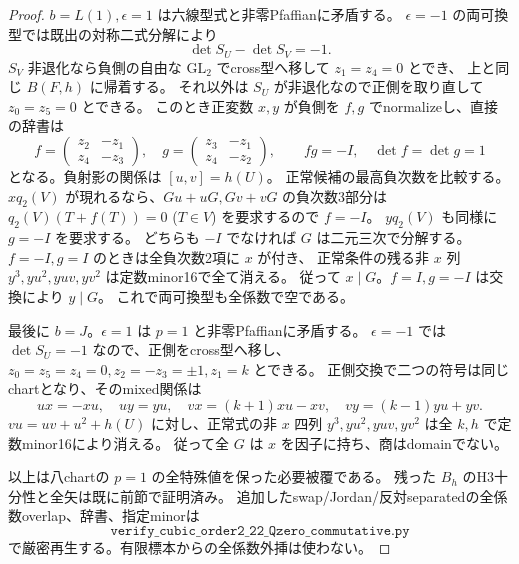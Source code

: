 \begin{proof}
$b=L(1),\epsilon=1$ は六線型式と非零Pfaffianに矛盾する。
$\epsilon=-1$ の両可換型では既出の対称二式分解により
\[
 \det S_U-\det S_V=-1.
\]
$S_V$ 非退化なら負側の自由な $\mathrm{GL}_2$ でcross型へ移して $z_1=z_4=0$ とでき、
上と同じ $B(F,h)$ に帰着する。
それ以外は $S_U$ が非退化なので正側を取り直して $z_0=z_5=0$ とできる。
このとき正変数 $x,y$ が負側を $f,g$ でnormalizeし、直接の辞書は
\[
 f=\begin{pmatrix}z_2&-z_1\\z_4&-z_3\end{pmatrix},\quad
 g=\begin{pmatrix}z_3&-z_1\\z_4&-z_2\end{pmatrix},\qquad
 fg=-I,\quad\det f=\det g=1
\]
となる。負射影の関係は $[u,v]=h(U)$。
正常候補の最高負次数を比較する。
$xq_2(V)$ が現れるなら、$Gu+uG,Gv+vG$ の負次数3部分は
$q_2(V)(T+f(T))=0$ ($T\in V$) を要求するので $f=-I$。
$yq_2(V)$ も同様に $g=-I$ を要求する。
どちらも $-I$ でなければ $G$ は二元三次で分解する。
$f=-I,g=I$ のときは全負次数2項に $x$ が付き、
正常条件の残る非 $x$ 列 $y^3,yu^2,yuv,yv^2$ は定数minor16で全て消える。
従って $x\mid G$。$f=I,g=-I$ は交換により $y\mid G$。
これで両可換型も全係数で空である。

最後に $b=J$。$\epsilon=1$ は $p=1$ と非零Pfaffianに矛盾する。
$\epsilon=-1$ では $\det S_U=-1$ なので、正側をcross型へ移し、
$z_0=z_5=z_4=0,z_2=-z_3=\pm1,z_1=k$ とできる。
正側交換で二つの符号は同じchartとなり、そのmixed関係は
\[
 ux=-xu,\quad uy=yu,\quad
 vx=(k+1)xu-xv,\quad vy=(k-1)yu+yv.
\]
$vu=uv+u^2+h(U)$ に対し、正常式の非 $x$ 四列
$y^3,yu^2,yuv,yv^2$ は全 $k,h$ で定数minor16により消える。
従って全 $G$ は $x$ を因子に持ち、商はdomainでない。

以上は八chartの $p=1$ の全特殊値を保った必要被覆である。
残った $B_h$ のH3十分性と全矢は既に前節で証明済み。
追加したswap/Jordan/反対separatedの全係数overlap、辞書、指定minorは
\[
\texttt{verify\_cubic\_order2\_22\_Qzero\_commutative.py}
\]
で厳密再生する。有限標本からの全係数外挿は使わない。
\end{proof}
